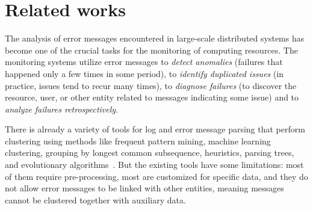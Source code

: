 \section{Related works}


The analysis of error messages encountered in large-scale distributed systems has become one of the crucial tasks for the monitoring of computing resources. The monitoring systems utilize error messages 
to {\emph{detect anomalies}} (failures that happened only a few times in some period), 
to {\emph{identify duplicated issues}} (in practice, issues tend to recur many times), 
to {\emph{diagnose failures}} (to discover the resource, user, or other entity related to messages indicating some issue) and 
to {\emph{analyze failures retrospectively}}. 

There is already a variety of tools for log and error message parsing that perform clustering using methods like frequent pattern mining, machine learning clustering, grouping by longest common subsequence, heuristics, parsing trees, and evolutionary algorithms~\cite{zhu2019tools}. But the existing tools have some limitations: most of them require pre-processing, most are customized for specific data, and they do not allow error messages to be linked with other entities, meaning messages cannot be clustered together with auxiliary data.

